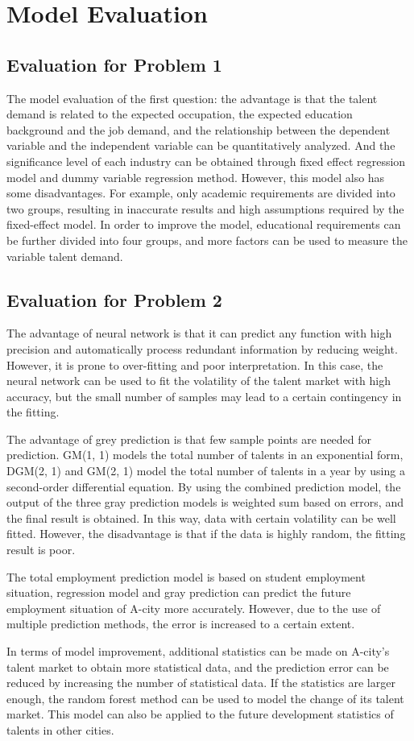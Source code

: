 \documentclass{mcmthesis}
\begin{document}
\section{Model Evaluation}


\subsection{Evaluation for Problem 1}
The model evaluation of the first question: the advantage is that the talent demand is related to the expected occupation, the expected education background and the job demand, and the relationship between the dependent variable and the independent variable can be quantitatively analyzed. And the significance level of each industry can be obtained through fixed effect regression model and dummy variable regression method. However, this model also has some disadvantages. For example, only academic requirements are divided into two groups, resulting in inaccurate results and high assumptions required by the fixed-effect model. In order to improve the model, educational requirements can be further divided into four groups, and more factors can be used to measure the variable talent demand.

\subsection{Evaluation for Problem 2}
The advantage of neural network is that it can predict any function with high precision and automatically process redundant information by reducing weight. However, it is prone to over-fitting and poor interpretation. In this case, the neural network can be used to fit the volatility of the talent market with high accuracy, but the small number of samples may lead to a certain contingency in the fitting.\par
The advantage of grey prediction is that few sample points are needed for prediction. GM(1, 1) models the total number of talents in an exponential form, DGM(2, 1) and GM(2, 1) model the total number of talents in a year by using a second-order differential equation. By using the combined prediction model, the output of the three gray prediction models is weighted sum based on errors, and the final result is obtained. In this way, data with certain volatility can be well fitted. However, the disadvantage is that if the data is highly random, the fitting result is poor. \par
The total employment prediction model is based on student employment situation, regression model and gray prediction can predict the future employment situation of A-city more accurately. However, due to the use of multiple prediction methods, the error is increased to a certain extent. \par
In terms of model improvement, additional statistics can be made on A-city's talent market to obtain more statistical data, and the prediction error can be reduced by increasing the number of statistical data. If the statistics are larger enough, the random forest method can be used to model the change of its talent market. This model can also be applied to the future development statistics of talents in other cities.
\end{document}
